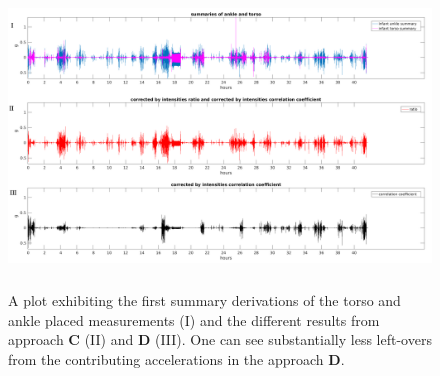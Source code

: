 \documentclass{article}
\begin{document}
{\begin{figure}[h!]
\includegraphics[width=15cm, height=8cm]{CorrectedIntensitiesCorrelation_result.png}
\caption{A plot exhibiting the first summary derivations of the torso and ankle placed measurements (I) and the different results from approach \textbf{C} (II) and \textbf{D} (III). One can see substantially less left-overs from the contributing accelerations in the approach \textbf{D}.}
\end{figure}

}
\end{document}
